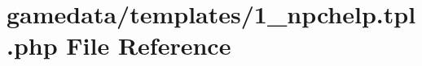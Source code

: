\hypertarget{1__npchelp_8tpl_8php}{\section{gamedata/templates/1\+\_\+npchelp.tpl.\+php File Reference}
\label{1__npchelp_8tpl_8php}
}

